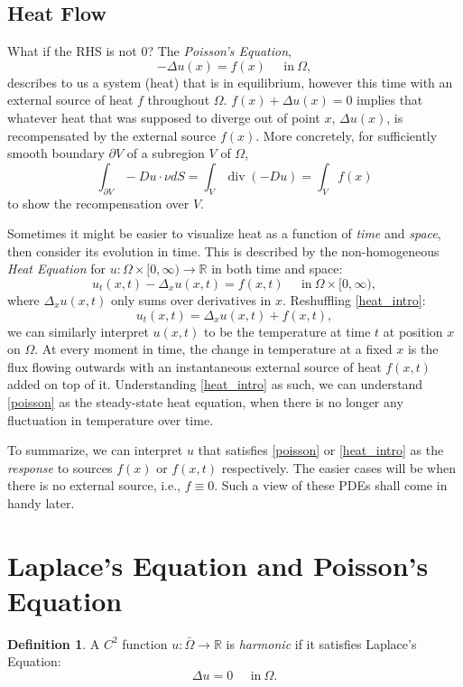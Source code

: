 \documentclass[openany, amssymb, psamsfonts]{amsart}
\theoremstyle{definition}
\newtheorem{defn}{Definition}[section]
\numberwithin{equation}{section}
\newcommand{\bbr}{\mathbb{R}}
\DeclareMathOperator{\Div}{div}
\begin{document}
\subsection{Heat Flow}
What if the RHS is not 0? The \textit{Poisson's Equation},
\begin{equation} \label{poisson}
    -\Delta u(x) = f(x) \;\;\;\;\; \text{in}\: \Omega ,
\end{equation}
describes to us a system (heat) that is in equilibrium, however this time with an external source of heat $f$ throughout $\Omega$. $f(x) + \Delta u(x) = 0$ implies that whatever heat that was supposed to diverge out of point $x$, $\Delta u (x)$, is recompensated by the external source $f(x)$. More concretely, for sufficiently smooth boundary $\partial V$ of a subregion $V$ of $\Omega$, \[
    \int_{\partial V} -Du \cdot \nu dS = \int_V \Div (-Du) = \int_V f(x)
\]
to show the recompensation over $V$.

Sometimes it might be easier to visualize heat as a function of \textit{time} and \textit{space}, then consider its evolution in time. This is described by the non-homogeneous \textit{Heat Equation} for $u: \Omega \times [0, \infty) \to \bbr$ in both time and space:
\begin{equation} \label{heat_intro}
    u_t(x, t) - \Delta_x u(x, t) = f(x, t) \;\;\;\;\; \text{in}\: \Omega \times [0, \infty),
\end{equation}
where $\Delta_x u(x, t)$ only sums over derivatives in $x$. Reshuffling \eqref{heat_intro}:
 \[
    u_t(x, t) = \Delta_x u(x, t) + f(x, t),
 \]
we can similarly interpret $u(x, t)$ to be the temperature at time $t$ at position $x$ on $\Omega$. At every moment in time, the change in temperature at a fixed $x$ is the flux flowing outwards with an instantaneous external source of heat $f(x, t)$ added on top of it. Understanding \eqref{heat_intro} as such, we can understand \eqref{poisson} as the steady-state heat equation, when there is no longer any fluctuation in temperature over time.

To summarize, we can interpret $u$ that satisfies \eqref{poisson} or \eqref{heat_intro} as the \textit{response} to sources $f(x)$ or $f(x, t)$ respectively. The easier cases will be when there is no external source, i.e., $f \equiv 0$. Such a view of these PDEs   shall come in handy later.
\section{Laplace's Equation and Poisson's Equation}
\begin{defn}
    A $C^2$ function $u: \bar{\Omega} \to \bbr$ is \textit{harmonic} if it satisfies Laplace's Equation:
    \begin{equation} \label{laplace}
        \Delta u = 0 \;\;\;\;\; \text{in}\: \Omega .
    \end{equation}
\end{defn}
\end{document}
